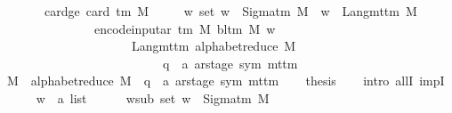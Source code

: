 \begin{isabellebody}
\ \ \ \ \ \ \ card{\isacharunderscore}{\kern0pt}ge{\isacharcolon}{\kern0pt}\ {\isachardoublequoteopen}card\ {\isacharparenleft}{\kern0pt}{\isasymGamma}{\isacharunderscore}{\kern0pt}tm\ M{\isacharparenright}{\kern0pt}\ {\isasymge}\ {}{\isachardoublequoteclose}\isanewline
\ \ \ {\isachardoublequoteopen}{\isasymforall}w{\isachardot}{\kern0pt}\ set\ w\ {\isasymsubseteq}\ Sigma{\isacharunderscore}{\kern0pt}tm\ M\ {\isasymlongrightarrow}\ w\ {\isasymin}\ Lang{\isacharunderscore}{\kern0pt}mttm\ M\isanewline
\ \ \ \ \ \ \ \ \ \ \ \ \ \ {\isasymlongrightarrow}\ encode{\isacharunderscore}{\kern0pt}input{\isacharunderscore}{\kern0pt}ar\ {\isacharparenleft}{\kern0pt}{\isasymGamma}{\isacharunderscore}{\kern0pt}tm\ M{\isacharparenright}{\kern0pt}\ {\isacharparenleft}{\kern0pt}bl{\isacharunderscore}{\kern0pt}tm\ M{\isacharparenright}{\kern0pt}\ w\isanewline
\ \ \ \ \ \ \ \ \ \ \ \ \ \ \ \ \ \ \ \ {\isasymin}\ Lang{\isacharunderscore}{\kern0pt}mttm\ {\isacharparenleft}{\kern0pt}alphabet{\isacharunderscore}{\kern0pt}reduce\ M\isanewline
\ \ \ \ \ \ \ \ \ \ \ \ \ \ \ \ \ \ \ \ \ \ \ \ \ {\isacharcolon}{\kern0pt}{\isacharcolon}{\kern0pt}\ {\isacharparenleft}{\kern0pt}{\isacharprime}{\kern0pt}q\ {\isasymtimes}\ {\isacharprime}{\kern0pt}a\ ar{\isacharunderscore}{\kern0pt}stage{\isacharcomma}{\kern0pt}\ sym{}{\isacharparenright}{\kern0pt}\ mttm{\isacharparenright}{\kern0pt}{\isachardoublequoteclose}\isanewline
%
\isadelimproof
%
\endisadelimproof
%
\isatagproof
{}\isamarkupfalse%
\ {\isacharminus}{\kern0pt}\isanewline
\ \ \isamarkupfalse%
\ {\isacharquery}{\kern0pt}M{\isacharprime}{\kern0pt}\ {\isacharequal}{\kern0pt}\ {\isachardoublequoteopen}alphabet{\isacharunderscore}{\kern0pt}reduce\ M\ {\isacharcolon}{\kern0pt}{\isacharcolon}{\kern0pt}\ {\isacharparenleft}{\kern0pt}{\isacharprime}{\kern0pt}q\ {\isasymtimes}\ {\isacharprime}{\kern0pt}a\ ar{\isacharunderscore}{\kern0pt}stage{\isacharcomma}{\kern0pt}\ sym{}{\isacharparenright}{\kern0pt}\ mttm{\isachardoublequoteclose}\isanewline
\ \ \isamarkupfalse%
\ {\isacharquery}{\kern0pt}thesis\isanewline
\ \ \isamarkupfalse%
\ {\isacharparenleft}{\kern0pt}intro\ allI\ impI{\isacharparenright}{\kern0pt}\isanewline
\ \ \ \ \isamarkupfalse%
\ w\ {\isacharcolon}{\kern0pt}{\isacharcolon}{\kern0pt}\ {\isachardoublequoteopen}{\isacharprime}{\kern0pt}a\ list{\isachardoublequoteclose}\isanewline
\ \ \ \ \isamarkupfalse%
\ w{\isacharunderscore}{\kern0pt}sub{\isacharcolon}{\kern0pt}\ {\isachardoublequoteopen}set\ w\ {\isasymsubseteq}\ Sigma{\isacharunderscore}{\kern0pt}tm\ M{\isachardoublequoteclose}\isanewline

\end{isabellebody}
